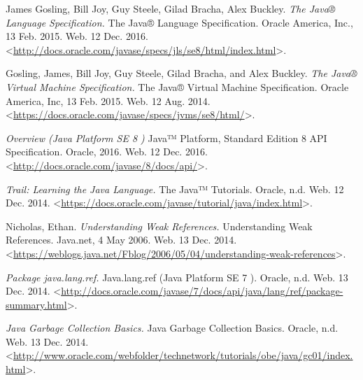 \begin{thebibliography}{21}

James Gosling, Bill Joy, Guy Steele, Gilad Bracha, Alex Buckley. \textit{The Java® Language Specification.} The Java® Language Specification. Oracle America, Inc., 13 Feb. 2015. Web. 12 Dec. 2016. <\url{http://docs.oracle.com/javase/specs/jls/se8/html/index.html}>.


Gosling, James, Bill Joy, Guy Steele, Gilad Bracha, and Alex Buckley. \textit{The Java® Virtual Machine Specification.} The Java® Virtual Machine Specification. Oracle America, Inc, 13 Feb. 2015. Web. 12 Aug. 2014. <\url{https://docs.oracle.com/javase/specs/jvms/se8/html/}>.


\textit{Overview (Java Platform SE 8 )} Java™ Platform, Standard Edition 8 API Specification. Oracle, 2016. Web. 12 Dec. 2016. <\url{http://docs.oracle.com/javase/8/docs/api/}>.


\textit{Trail: Learning the Java Language.} The Java™ Tutorials. Oracle, n.d. Web. 12 Dec. 2014. <\url{https://docs.oracle.com/javase/tutorial/java/index.html}>.


Nicholas, Ethan. \textit{Understanding Weak References.} Understanding Weak References. Java.net, 4 May 2006. Web. 13 Dec. 2014. <\url{https://weblogs.java.net/Fblog/2006/05/04/understanding-weak-references}>.


\textit{Package java.lang.ref.} Java.lang.ref (Java Platform SE 7 ). Oracle, n.d. Web. 13 Dec. 2014. <\url{http://docs.oracle.com/javase/7/docs/api/java/lang/ref/package-summary.html}>.


\textit{Java Garbage Collection Basics.} Java Garbage Collection Basics. Oracle, n.d. Web. 13 Dec. 2014. <\url{http://www.oracle.com/webfolder/technetwork/tutorials/obe/java/gc01/index.html}>.


\end{thebibliography}
